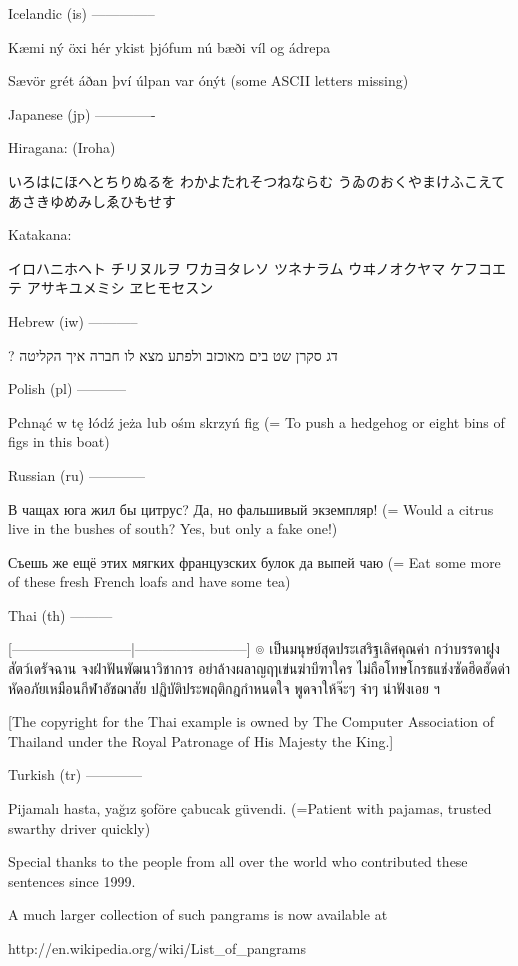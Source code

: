 Icelandic (is)
--------------

  Kæmi ný öxi hér ykist þjófum nú bæði víl og ádrepa

  Sævör grét áðan því úlpan var ónýt
  (some ASCII letters missing)

Japanese (jp)
-------------

  Hiragana: (Iroha)

  いろはにほへとちりぬるを
  わかよたれそつねならむ
  うゐのおくやまけふこえて
  あさきゆめみしゑひもせす

  Katakana:

  イロハニホヘト チリヌルヲ ワカヨタレソ ツネナラム
  ウヰノオクヤマ ケフコエテ アサキユメミシ ヱヒモセスン

Hebrew (iw)
-----------

  ? דג סקרן שט בים מאוכזב ולפתע מצא לו חברה איך הקליטה

Polish (pl)
-----------

  Pchnąć w tę łódź jeża lub ośm skrzyń fig
  (= To push a hedgehog or eight bins of figs in this boat)

Russian (ru)
------------

  В чащах юга жил бы цитрус? Да, но фальшивый экземпляр!
  (= Would a citrus live in the bushes of south? Yes, but only a fake one!)

  Съешь же ещё этих мягких французских булок да выпей чаю
  (= Eat some more of these fresh French loafs and have some tea) 

Thai (th)
---------

  [--------------------------|------------------------]
  ๏ เป็นมนุษย์สุดประเสริฐเลิศคุณค่า  กว่าบรรดาฝูงสัตว์เดรัจฉาน
  จงฝ่าฟันพัฒนาวิชาการ           อย่าล้างผลาญฤๅเข่นฆ่าบีฑาใคร
  ไม่ถือโทษโกรธแช่งซัดฮึดฮัดด่า     หัดอภัยเหมือนกีฬาอัชฌาสัย
  ปฏิบัติประพฤติกฎกำหนดใจ        พูดจาให้จ๊ะๆ จ๋าๆ น่าฟังเอย ฯ

  [The copyright for the Thai example is owned by The Computer
  Association of Thailand under the Royal Patronage of His Majesty the
  King.]

Turkish (tr)
------------

  Pijamalı hasta, yağız şoföre çabucak güvendi.
  (=Patient with pajamas, trusted swarthy driver quickly)


Special thanks to the people from all over the world who contributed
these sentences since 1999.

A much larger collection of such pangrams is now available at

  http://en.wikipedia.org/wiki/List_of_pangrams


